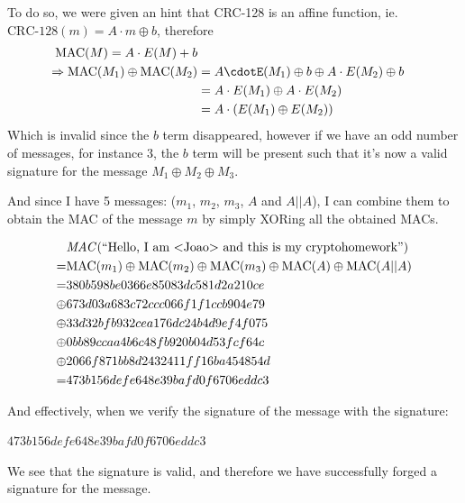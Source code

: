 \documentclass{article}
\begin{document}
To do so, we were given an hint that CRC-128 is an affine function, ie. $\text{CRC-128}(m) = A \cdot m \oplus b$, therefore
\begin{equation}
\begin{aligned}
                \text{MAC}(M) = A \cdot E(M) + b \\
                \Rightarrow \text{MAC}(M_1) \oplus \text{MAC}(M_2) &= A \cdotE(M_1) \oplus b \oplus A \cdot E(M_2) \oplus b  \\
                                                                   &= A \cdot E(M_1) \oplus A \cdot E(M_2)\\
                                                                   &= A \cdot (E(M_1) \oplus E(M_2))

\end{aligned}
\end{equation}
Which is invalid since the $b$ term disappeared, however if we have an odd number of messages, for instance 3, the $b$ term will be present such that it's now a valid signature for the message $M_1 \oplus M_2 \oplus M_3$.

And since I have 5 messages: ($m_1$, $m_2$, $m_3$, $A$ and $A||A$), I can combine them to obtain the MAC of the message $m$ by simply XORing all the obtained MACs.

\begin{equation}
\begin{aligned}
    &\text{\textit{MAC}}(\text{``Hello, I am <Joao> and this is my cryptohomework''}) \\
    =&\text{MAC}(m_1) \oplus \text{MAC}(m_2) \oplus \text{MAC}(m_3) \oplus \text{MAC}(A) \oplus \text{MAC}(A||A) \\
    =&380b598be0366e85083dc581d2a210ce \\
    \oplus &673d03a683c72ccc066f1f1ccb904e79 \\
    \oplus &33d32bfb932cea176dc24b4d9ef4f075 \\
    \oplus &0bb89ccaa4b6c48fb920b04d53fcf64c \\
    \oplus &2066f871bb8d2432411ff16ba454854d \\
    =&473b156defe648e39bafd0f6706eddc3
\end{aligned}
\end{equation}

And effectively, when we verify the signature of the message with the signature:

$473b156defe648e39bafd0f6706eddc3$

We see that the signature is valid, and therefore we have successfully forged a signature for the message.
\end{document}
